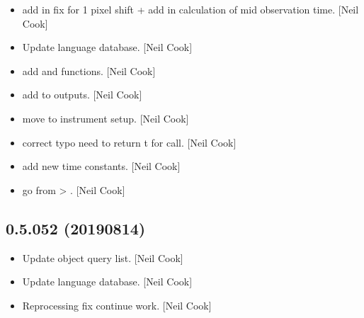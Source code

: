 \documentclass[a4paper,10pt,english]{report}
\begin{document}
\begin{itemize}
\item {} 
 \sphinxhyphen{} add in fix for 1 pixel shift + add in
calculation of mid observation time. {[}Neil Cook{]}

\item {} 
Update language database. {[}Neil Cook{]}

\item {} 
 \sphinxhyphen{} add  and  functions.
{[}Neil Cook{]}

\item {} 
 \sphinxhyphen{} add  to
outputs. {[}Neil Cook{]}

\item {} 
 \sphinxhyphen{} move  to instrument
setup. {[}Neil Cook{]}

\item {} 
 \sphinxhyphen{} correct typo need to return t for 
call. {[}Neil Cook{]}

\item {} 
 \sphinxhyphen{} add new time constants. {[}Neil Cook{]}

\item {} 
 \sphinxhyphen{} go from  \textendash{}\textgreater{} . {[}Neil Cook{]}

\end{itemize}


\subsection{0.5.052 (2019\sphinxhyphen{}08\sphinxhyphen{}14)}
\label{\detokenize{misc/changelog:id110}}\begin{itemize}
\item {} 
Update object query list. {[}Neil Cook{]}

\item {} 
Update language database. {[}Neil Cook{]}

\item {} 
Reprocessing fix \sphinxhyphen{} continue work. {[}Neil Cook{]}

\end{itemize}
\end{document}
